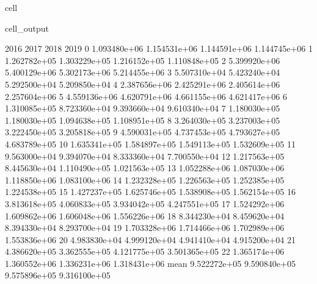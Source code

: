\documentclass[letterpaper,10pt,english]{jupyterBook}
\begin{document}
\begin{sphinxuseclass}{cell}
\begin{sphinxVerbatimOutput}
\begin{sphinxuseclass}{cell_output}
\begin{sphinxVerbatim}[commandchars=\\\{\}]
              2016          2017          2018          2019  \PYGZbs{}
0     1.093480e+06  1.154531e+06  1.144591e+06  1.144745e+06   
1     1.262782e+05  1.303229e+05  1.216152e+05  1.110848e+05   
2     5.399920e+06  5.400129e+06  5.302173e+06  5.214455e+06   
3     5.507310e+04  5.423240e+04  5.292500e+04  5.209850e+04   
4     2.387656e+06  2.425291e+06  2.405614e+06  2.257604e+06   
5     4.559136e+06  4.620791e+06  4.661155e+06  4.621417e+06   
6     1.310085e+05  8.723360e+04  9.393660e+04  9.610340e+04   
7     1.180030e+05  1.180030e+05  1.094638e+05  1.108951e+05   
8     3.264030e+05  3.237003e+05  3.222450e+05  3.205818e+05   
9     4.590031e+05  4.737453e+05  4.793627e+05  4.683789e+05   
10    1.635341e+05  1.584897e+05  1.549113e+05  1.532609e+05   
11    9.563000e+04  9.394070e+04  8.333360e+04  7.700550e+04   
12    1.217563e+05  8.445630e+04  1.110490e+05  1.021563e+05   
13    1.052288e+06  1.087030e+06  1.118850e+06  1.083100e+06   
14    1.232328e+05  1.226563e+05  1.252385e+05  1.224538e+05   
15    1.427237e+05  1.625746e+05  1.538908e+05  1.562154e+05   
16    3.813618e+05  4.060833e+05  3.934042e+05  4.247551e+05   
17    1.524292e+06  1.609862e+06  1.606048e+06  1.556226e+06   
18    8.344230e+04  8.459620e+04  8.394330e+04  8.293700e+04   
19    1.703328e+06  1.714466e+06  1.702989e+06  1.553836e+06   
20    4.983830e+04  4.999120e+04  4.941410e+04  4.915200e+04   
21    4.386620e+05  3.362555e+05  4.121775e+05  3.501365e+05   
22    1.365174e+06  1.360552e+06  1.336231e+06  1.318431e+06   
mean  9.522272e+05  9.590840e+05  9.575896e+05  9.316100e+05   


\end{sphinxVerbatim}
\end{sphinxuseclass}
\end{sphinxVerbatimOutput}
\end{sphinxuseclass}
\end{document}
